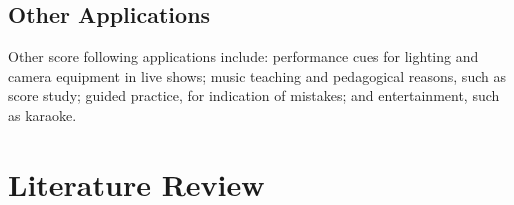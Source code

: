 
\subsection{Other Applications}
Other score following applications include: performance cues for lighting and camera equipment in live shows; music teaching and pedagogical reasons, such as score study; guided practice, for indication of mistakes; and entertainment, such as karaoke. 





 

\section{Literature Review}{\label{section:literature_review}}
